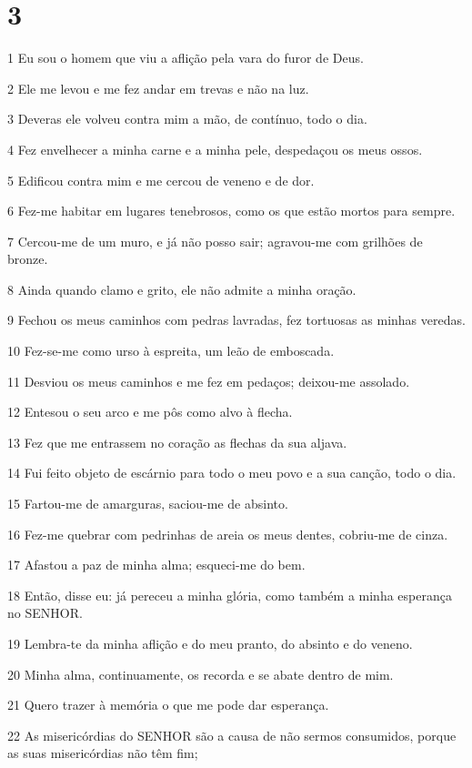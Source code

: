 \chapter{3}

\par 1 Eu sou o homem que viu a aflição pela vara do furor de Deus.
\par 2 Ele me levou e me fez andar em trevas e não na luz.
\par 3 Deveras ele volveu contra mim a mão, de contínuo, todo o dia.
\par 4 Fez envelhecer a minha carne e a minha pele, despedaçou os meus ossos.
\par 5 Edificou contra mim e me cercou de veneno e de dor.
\par 6 Fez-me habitar em lugares tenebrosos, como os que estão mortos para sempre.
\par 7 Cercou-me de um muro, e já não posso sair; agravou-me com grilhões de bronze.
\par 8 Ainda quando clamo e grito, ele não admite a minha oração.
\par 9 Fechou os meus caminhos com pedras lavradas, fez tortuosas as minhas veredas.
\par 10 Fez-se-me como urso à espreita, um leão de emboscada.
\par 11 Desviou os meus caminhos e me fez em pedaços; deixou-me assolado.
\par 12 Entesou o seu arco e me pôs como alvo à flecha.
\par 13 Fez que me entrassem no coração as flechas da sua aljava.
\par 14 Fui feito objeto de escárnio para todo o meu povo e a sua canção, todo o dia.
\par 15 Fartou-me de amarguras, saciou-me de absinto.
\par 16 Fez-me quebrar com pedrinhas de areia os meus dentes, cobriu-me de cinza.
\par 17 Afastou a paz de minha alma; esqueci-me do bem.
\par 18 Então, disse eu: já pereceu a minha glória, como também a minha esperança no SENHOR.
\par 19 Lembra-te da minha aflição e do meu pranto, do absinto e do veneno.
\par 20 Minha alma, continuamente, os recorda e se abate dentro de mim.
\par 21 Quero trazer à memória o que me pode dar esperança.
\par 22 As misericórdias do SENHOR são a causa de não sermos consumidos, porque as suas misericórdias não têm fim;
